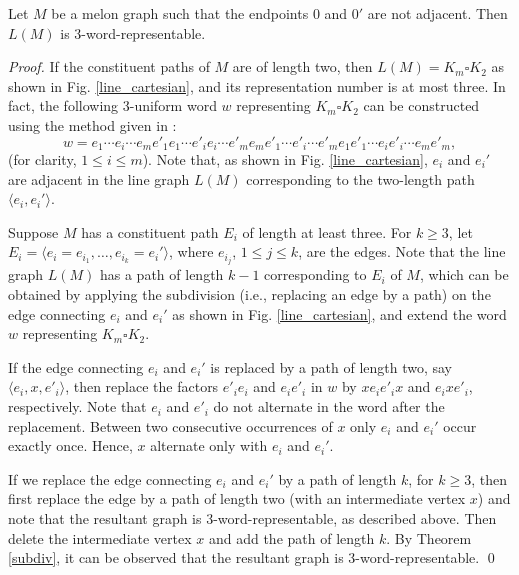 \documentclass{llncs}
\begin{document}
\begin{lemma}\label{non-adjacent_line}
	Let $M$ be a melon graph such that the endpoints $0$ and $0'$ are not adjacent. Then $L(M)$ is $3$-word-representable.
\end{lemma}
\begin{proof}
	If the constituent paths of $M$ are of length two, then $L(M) = K_m \square K_2$ as shown in Fig. \ref{line_cartesian}, and its representation number is at most three. In fact, the following 3-uniform word $w$ representing $K_m \square K_2$ can be constructed using the method given in \cite{broere_2019}:  
	\[w = e_1 \cdots e_i \cdots e_m e'_1 e_1 \cdots e'_i e_i \cdots e'_m e_m e'_1 \cdots e'_i \cdots e'_m e_1 e'_1 \cdots e_i e'_i \cdots e_m e'_m,\] (for clarity, $1 \le i \le m$).
	Note that, as shown in Fig. \ref{line_cartesian}, $e_i$ and $e_i'$ are adjacent in the line graph $L(M)$ corresponding to the two-length path $\langle e_i, e_i'\rangle$.
	
	Suppose $M$ has a constituent path $E_i$ of length at least three. For $k \ge 3$, let $E_i = \langle e_i = e_{i_1}, \ldots, e_{i_k} = e_i'\rangle$, where $e_{i_j}$, $1 \le j \le k$, are the edges. Note that the line graph $L(M)$ has a path of length $k-1$ corresponding to $E_i$ of $M$, which can be obtained by applying the subdivision (i.e.,  replacing an edge by a path) on the edge connecting $e_i$ and  $e_i'$ as shown in Fig. \ref{line_cartesian}, and extend the word $w$ representing $K_m \square K_2$.
	
	If the edge connecting $e_i$ and  $e_i'$ is replaced by a path of length two, say $\langle e_i, x, e'_i \rangle$, then replace the factors $e'_i e_i$ and $e_i e'_i $ in $w$ by $xe_ie'_ix$ and $e_i x e'_i$, respectively. Note that $e_i$ and $e'_i$ do not alternate in the word after the replacement. Between two consecutive occurrences of $x$ only $e_i$ and $e_i'$ occur exactly once. Hence, $x$ alternate only with $e_i$ and $e_i'$.
	
	If we replace the edge connecting $e_i$ and  $e_i'$ by a path of length $k$, for $k \ge 3$, then first replace the edge by a path of length two (with an intermediate vertex $x$) and note that the resultant graph is 3-word-representable, as described above.  Then delete the intermediate vertex $x$ and add the path of length $k$. By Theorem \ref{subdiv}, it can be observed that the resultant graph is 3-word-representable. \qed
\end{proof}
\end{document}
